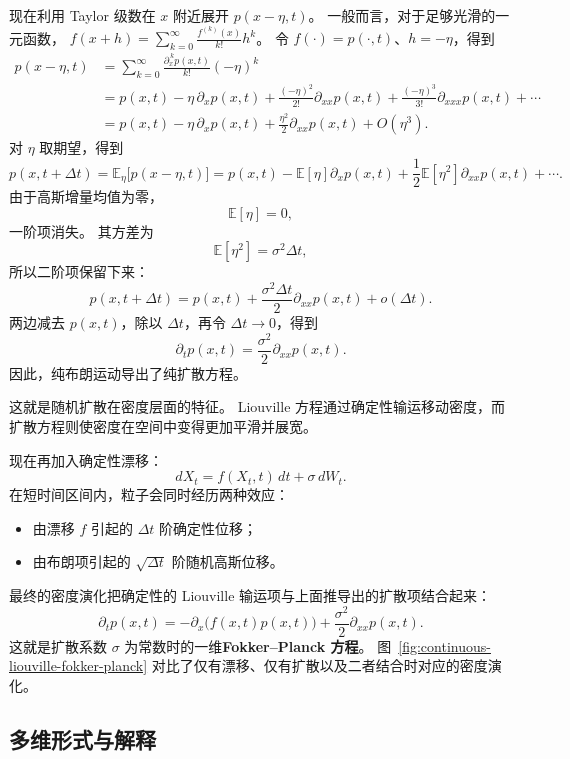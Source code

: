 现在利用 Taylor 级数在 $x$ 附近展开 $p(x-\eta,t)$。
一般而言，对于足够光滑的一元函数，
$f(x+h)=\sum_{k=0}^{\infty}\frac{f^{(k)}(x)}{k!}h^k$。
令 $f(\cdot)=p(\cdot,t)$、$h=-\eta$，得到
\[
\begin{aligned}
p(x-\eta,t)
&=
\sum_{k=0}^{\infty}
\frac{\partial_x^{\,k}p(x,t)}{k!}(-\eta)^k \\[4pt]
&=
p(x,t)
-\eta\,\partial_x p(x,t)
+\frac{(-\eta)^2}{2!}\partial_{xx}p(x,t)
+\frac{(-\eta)^3}{3!}\partial_{xxx}p(x,t)
+\cdots \\[4pt]
&=
p(x,t)-\eta\,\partial_x p(x,t)
+\frac{\eta^2}{2}\partial_{xx}p(x,t)
+O(\eta^3).
\end{aligned}
\]
对 $\eta$ 取期望，得到
\[
p(x,t+\Delta t)
=
\mathbb{E}_{\eta}\bigl[p(x-\eta,t)\bigr]
=
p(x,t)
-
\mathbb{E}[\eta]\partial_x p(x,t)
+
\frac{1}{2}\mathbb{E}[\eta^2]\partial_{xx}p(x,t)
+\cdots.
\]
由于高斯增量均值为零，
\[
\mathbb{E}[\eta]=0,
\]
一阶项消失。
其方差为
\[
\mathbb{E}[\eta^2]=\sigma^2\Delta t,
\]
所以二阶项保留下来：
\[
p(x,t+\Delta t)
=
p(x,t)+\frac{\sigma^2\Delta t}{2}\partial_{xx}p(x,t)+o(\Delta t).
\]
两边减去 $p(x,t)$，除以 $\Delta t$，再令 $\Delta t\to 0$，得到
\[
\boxed{
\partial_t p(x,t)=\frac{\sigma^2}{2}\partial_{xx}p(x,t).
}
\]
因此，纯布朗运动导出了纯扩散方程。

这就是随机扩散在密度层面的特征。
Liouville 方程通过确定性输运移动密度，而扩散方程则使密度在空间中变得更加平滑并展宽。

现在再加入确定性漂移：
\[
dX_t=f(X_t,t)\,dt+\sigma\,dW_t.
\]
在短时间区间内，粒子会同时经历两种效应：
\begin{itemize}
    \item 由漂移 $f$ 引起的 $\Delta t$ 阶确定性位移；
    \item 由布朗项引起的 $\sqrt{\Delta t}$ 阶随机高斯位移。
\end{itemize}
最终的密度演化把确定性的 Liouville 输运项与上面推导出的扩散项结合起来：
\[
\boxed{
\partial_t p(x,t)
=
-\partial_x\bigl(f(x,t)p(x,t)\bigr)
+
\frac{\sigma^2}{2}\partial_{xx}p(x,t).
}
\]
这就是扩散系数 $\sigma$ 为常数时的一维\textbf{Fokker--Planck 方程}。
图~\ref{fig:continuous-liouville-fokker-planck} 对比了仅有漂移、仅有扩散以及二者结合时对应的密度演化。



\subsection{多维形式与解释}

